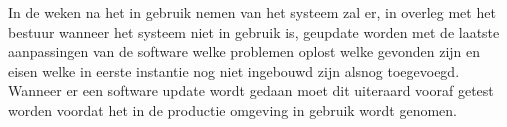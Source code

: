 In de weken na het in gebruik nemen van het systeem zal er, in overleg met het bestuur wanneer het systeem niet in gebruik is, geupdate worden met de laatste aanpassingen van de software welke problemen oplost welke gevonden zijn en eisen welke in eerste instantie nog niet ingebouwd zijn alsnog toegevoegd. Wanneer er een software update wordt gedaan moet dit uiteraard vooraf getest worden voordat het in de productie omgeving in gebruik wordt genomen. 
